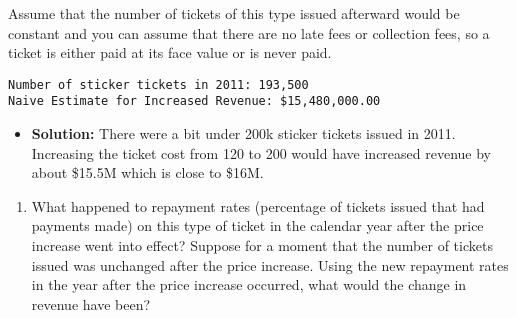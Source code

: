 \documentclass[
  letterpaper,
  DIV=11,
  numbers=noendperiod]{scrartcl}
\newenvironment{Shaded}{\begin{snugshade}}{\end{snugshade}}
\newcommand{\BuiltInTok}[1]{\textcolor[rgb]{0.00,0.23,0.31}{#1}}
\newcommand{\CommentTok}[1]{\textcolor[rgb]{0.37,0.37,0.37}{#1}}
\newcommand{\DecValTok}[1]{\textcolor[rgb]{0.68,0.00,0.00}{#1}}
\newcommand{\NormalTok}[1]{\textcolor[rgb]{0.00,0.23,0.31}{#1}}
\newcommand{\OperatorTok}[1]{\textcolor[rgb]{0.37,0.37,0.37}{#1}}
\newcommand{\SpecialCharTok}[1]{\textcolor[rgb]{0.37,0.37,0.37}{#1}}
\newcommand{\SpecialStringTok}[1]{\textcolor[rgb]{0.13,0.47,0.30}{#1}}
\newcommand{\StringTok}[1]{\textcolor[rgb]{0.13,0.47,0.30}{#1}}
\providecommand{\tightlist}{%
  \setlength{\itemsep}{0pt}\setlength{\parskip}{0pt}}\usepackage{longtable,booktabs,array}
\begin{document}
Assume that the number of tickets of this type issued afterward would be
constant and you can assume that there are no late fees or collection
fees, so a ticket is either paid at its face value or is never paid.

\begin{Shaded}
\end{Shaded}

\begin{verbatim}
Number of sticker tickets in 2011: 193,500
Naive Estimate for Increased Revenue: $15,480,000.00
\end{verbatim}

\begin{itemize}
\tightlist
\item
  \textbf{Solution:} There were a bit under 200k sticker tickets issued
  in 2011. Increasing the ticket cost from 120 to 200 would have
  increased revenue by about \$15.5M which is close to \$16M.
\end{itemize}

\begin{enumerate}
\def\labelenumi{\arabic{enumi}.}
\setcounter{enumi}{3}
\tightlist
\item
  What happened to repayment rates (percentage of tickets issued that
  had payments made) on this type of ticket in the calendar year after
  the price increase went into effect? Suppose for a moment that the
  number of tickets issued was unchanged after the price increase. Using
  the new repayment rates in the year after the price increase occurred,
  what would the change in revenue have been?
\end{enumerate}
\end{document}
